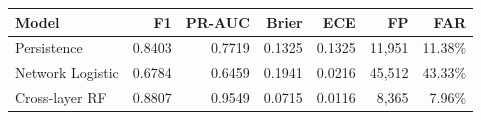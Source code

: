 \begin{tabular}{lrrrrrr}
\toprule
Model & F1 & PR-AUC & Brier & ECE & FP & FAR \\
\midrule
Persistence & 0.8403 & 0.7719 & 0.1325 & 0.1325 & 11,951 & 11.38\% \\
Network Logistic & 0.6784 & 0.6459 & 0.1941 & 0.0216 & 45,512 & 43.33\% \\
Cross-layer RF & 0.8807 & 0.9549 & 0.0715 & 0.0116 & 8,365 & 7.96\% \\
\bottomrule
\end{tabular}
